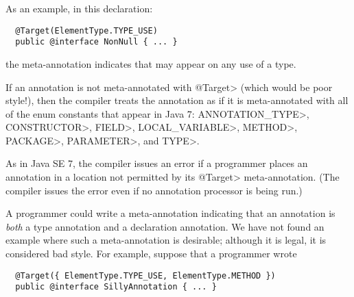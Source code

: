 \documentclass[10pt]{article}
\begin{document}
As an example, in this declaration:

\preverbnegspace
\begin{Verbatim}
  @Target(ElementType.TYPE_USE)
  public @interface NonNull { ... }
\end{Verbatim}

\noindent
the  meta-annotation indicates that
 may appear on any use of a type.

If an annotation is not meta-annotated with \<@Target> (which would be poor
style!), then the compiler treats the annotation as if it is
meta-annotated with all of the  enum constants
that appear in Java 7: \<ANNOTATION\_TYPE>, \<CONSTRUCTOR>, \<FIELD>,
\<LOCAL\_VARIABLE>, \<METHOD>, \<PACKAGE>, \<PARAMETER>, and \<TYPE>.

As in Java SE 7, the compiler issues an error if a programmer places an
annotation in a location not permitted by its \<@Target> meta-annotation.  (The
compiler issues the error even if no annotation processor is being run.)

A programmer could write a  meta-annotation indicating that an
annotation is \emph{both} a type annotation and a declaration annotation.
We have not found an example where such a meta-annotation is desirable;
although it is legal, it is considered bad style.
For example, suppose that a programmer wrote 

\preverbnegspace
\begin{Verbatim}
  @Target({ ElementType.TYPE_USE, ElementType.METHOD })
  public @interface SillyAnnotation { ... }
\end{Verbatim}
\end{document}
